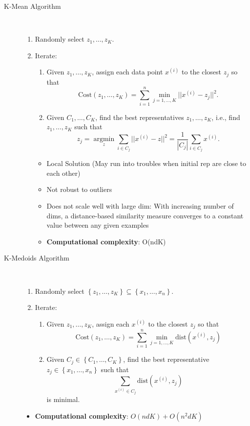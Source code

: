 \documentclass[a4paper, 10pt,landscape]{article}
\DeclareMathOperator*{\argmin}{argmin}
\begin{document}
\begin{multicols*}{3}
\begin{description}
	\item[K-Mean Algorithm]~
		\begin{enumerate}
			\item Randomly select $z_1,\dots,z_K$.
			\item Iterate:
			\begin{enumerate}
				\item Given $z_1,\dots,z_K$, assign each data point $x^{(i)}$ to the closest $z_j$ so that
				$$\text{Cost}\left(z_1,\dots,z_K\right)=\sum_{i=1}^{n}\min\limits_{j=1,\dots,K}||x^{(i)}-z_j||^2.$$
				\item Given $C_1,\dots,C_K$, find the best representatives $z_1,\dots,z_K$, i.e., find $z_1,\dots,z_K$ such that
				$$z_j=\argmin\limits_{z}\sum_{i\in C_j}||{x^{(i)}-z}||^2=\dfrac{1}{\left|C_j\right|}\sum\limits_{i\in C_j}x^{(i)}.$$
			\end{enumerate}
			\begin{itemize}
				\item Local Solution (May run into troubles when initial rep are close to each other)
				\item Not robust to outliers
				\item Does not scale well with large dim: With increasing number of dims, a distance-based similarity measure converges to a constant value between any given examples
				\item {\bf Computational complexity}: O(ndK)
			\end{itemize}
		\end{enumerate}

	\item[K-Medoids Algorithm]~
		\begin{enumerate}
			\item Randomly select $\left\{z_1,\dots,z_K\right\}\subseteq\left\{x_1,\dots,x_n\right\}$.
			\item Iterate:
			\begin{enumerate}
				\item Given $z_1,\dots,z_K$, assign each $x^{(i)}$ to the closest $z_j$ so that
				$$\text{Cost}\left(z_1,\dots,z_K\right)=\sum_{i=1}^{n}\min\limits_{j=1,\dots,K}\text{dist}\left(x^{(i)},z_j\right)$$
				\item Given $C_j\in\left\{C_1,\dots,C_K\right\}$, find the best representative $z_j\in\left\{x_1,\dots,x_n\right\}$ such that
				$$\sum\limits_{x^{(i)}\in C_j}\text{dist}\left(x^{(i)},z_j\right)$$
				is minimal.
			\end{enumerate}
		\end{enumerate}
		\begin{itemize}
			\item {\bf Computational complexity}: $O(ndK) + O(n^2dK)$
		\end{itemize}


\end{description}
\end{multicols*}
\end{document}
